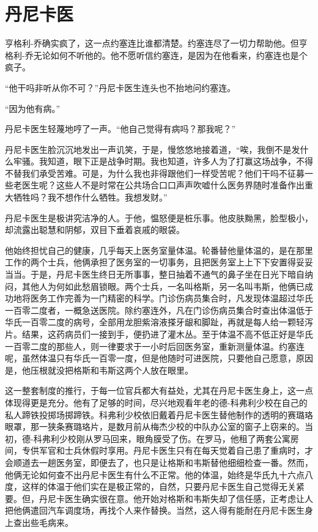 \chapter{丹尼卡医}
 
    亨格利-乔确实疯了，这一点约塞连比谁都清楚。约塞连尽了一切力帮助他。但亨格利-乔无论如何不听他的。他不愿听信约塞连，是因为在他看来，约塞连也是个疯子。

    “他干吗非听从你不可？”丹尼卡医生连头也不抬地问约塞连。

    “因为他有病。”

    丹尼卡医生轻蔑地哼了一声。“他自己觉得有病吗？那我呢？”

    丹尼卡医生脸沉沉地发出一声讥笑，于是，慢悠悠地接着道，“唉，我倒不是发什么牢骚。我知道，眼下正是战争时期。我也知道，许多人为了打赢这场战争，不得不替我们承受苦难。可是，为什么我也非得跟他们一样受苦呢？他们干吗不征募一些老医生呢？这些人不是时常在公共场合口口声声吹嘘什么医务界随时准备作出重大牺牲吗？我不想作什么牺牲。我想发财。”

    丹尼卡医生是极讲究洁净的人。于他，愠怒便是桩乐事。他皮肤黝黑，脸型极小，却流露出聪慧和阴郁，双目下垂着哀戚的眼袋。

    他始终担忧自己的健康，几乎每天上医务室量体温。轮番替他量体温的，是在那里工作的两个士兵，他俩承担了医务室的一切事务，且把医务室上上下下安置得妥妥当当。于是，丹尼卡医生终日无所事事，整日抽着不通气的鼻子坐在日光下暗自纳闷，其他人为何如此愁眉锁眼。两个士兵，一名叫格斯，另一名叫韦斯，他俩已成功地将医务工作完善为一门精密的科学。门诊伤病员集合时，凡发现体温超过华氏一百零二度者，一概急送医院。除约塞连外，凡在门诊伤病员集合时查出体温低于华氏一百零二度的病号，全部用龙胆紫溶液搽牙龈和脚趾，再就是每人给一颗轻泻片。结果，这药病员们一接到手，便扔进了灌木丛。至于体温不高不低正好是华氏一百零二度的那些人，则一律要求于一小时后回医务室，重新测量体温。约塞连呢，虽然体温只有华氏一百零一度，但是他随时可进医院，只要他自己愿意，原因是，他压根就没把格斯和韦斯这两个人放在眼里。

 


    这一整套制度的推行，于每一位官兵都大有益处，尤其在丹尼卡医生身上，这一点体现得更是充分。他有了足够的时间，尽兴地观看年老的德-科弗利少校在自己的私人蹄铁投掷场掷蹄铁。科弗利少校依旧戴着丹尼卡医生替他制作的透明的赛璐珞眼罩，那一狭条赛璐珞片，是数月前从梅杰少校的中队办公室的窗子上窃来的。当初，德-科弗利少校刚从罗马回来，眼角膜受了伤。在罗马，他租了两套公寓房间，专供军官和士兵休假时享用。丹尼卡医生只有在每天觉着自己患了重病时，才会顺道去一趟医务室，即便去了，也只是让格斯和韦斯替他细细检查一番。然而，他俩无论如何查不出丹尼卡医生有什么不正常。他的体温，始终是华氏九十六点八度，这样的体温于他们实在是极正常的，自然，只要丹尼卡医生自己觉得无关紧要。但，丹尼卡医生确实很在意。他开始对格斯和韦斯失却了信任感，正考虑让人把他俩遣回汽车调度场，再找个人来作替换。当然，这人得有能耐在丹尼卡医生身上查出些毛病来。

